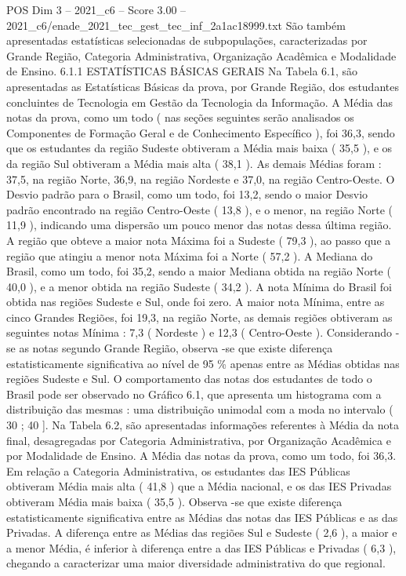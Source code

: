 \begin{textsample}{POS Dim 3 – 2021\_c6 – Score 3.00 – 2021\_c6/enade\_2021\_tec\_gest\_tec\_inf\_2a1ac18999.txt}
São também apresentadas estatísticas selecionadas de subpopulações, caracterizadas por Grande Região, Categoria Administrativa, Organização Acadêmica e Modalidade de Ensino. 6.1.1 ESTATÍSTICAS BÁSICAS GERAIS Na Tabela 6.1, são apresentadas as Estatísticas Básicas da prova, por Grande Região, dos estudantes concluintes de Tecnologia em Gestão da Tecnologia da Informação.
A Média das notas da prova, como um todo ( nas seções seguintes serão analisados os Componentes de Formação Geral e de Conhecimento Específico ), foi 36,3, sendo que os estudantes da região Sudeste obtiveram a Média mais baixa ( 35,5 ), e os da região Sul obtiveram a Média mais alta ( 38,1 ).
As demais Médias foram : 37,5, na região Norte, 36,9, na região Nordeste e 37,0, na região Centro-Oeste.
O Desvio padrão para o Brasil, como um todo, foi 13,2, sendo o maior Desvio padrão encontrado na região Centro-Oeste ( 13,8 ), e o menor, na região Norte ( 11,9 ), indicando uma dispersão um pouco menor das notas dessa última região.
A região que obteve a maior nota Máxima foi a Sudeste ( 79,3 ), ao passo que a região que atingiu a menor nota Máxima foi a Norte ( 57,2 ).
A Mediana do Brasil, como um todo, foi 35,2, sendo a maior Mediana obtida na região Norte ( 40,0 ), e a menor obtida na região Sudeste ( 34,2 ).
A nota Mínima do Brasil foi obtida nas regiões Sudeste e Sul, onde foi zero.
A maior nota Mínima, entre as cinco Grandes Regiões, foi 19,3, na região Norte, as demais regiões obtiveram as seguintes notas Mínima : 7,3 ( Nordeste ) e 12,3 ( Centro-Oeste ).
Considerando -se as notas segundo Grande Região, observa -se que existe diferença estatisticamente significativa ao nível de 95 \% apenas entre as Médias obtidas nas regiões Sudeste e Sul.
O comportamento das notas dos estudantes de todo o Brasil pode ser observado no Gráfico 6.1, que apresenta um histograma com a distribuição das mesmas : uma distribuição unimodal com a moda no intervalo ( 30 ; 40 ].
Na Tabela 6.2, são apresentadas informações referentes à Média da nota final, desagregadas por Categoria Administrativa, por Organização Acadêmica e por Modalidade de Ensino.
A Média das notas da prova, como um todo, foi 36,3.
Em relação a Categoria Administrativa, os estudantes das IES Públicas obtiveram Média mais alta ( 41,8 ) que a Média nacional, e os das IES Privadas obtiveram Média mais baixa ( 35,5 ).
Observa -se que existe diferença estatisticamente significativa entre as Médias das notas das IES Públicas e as das Privadas.
A diferença entre as Médias das regiões Sul e Sudeste ( 2,6 ), a maior e a menor Média, é inferior à diferença entre a das IES Públicas e Privadas ( 6,3 ), chegando a caracterizar uma maior diversidade administrativa do que regional.

\end{textsample}
